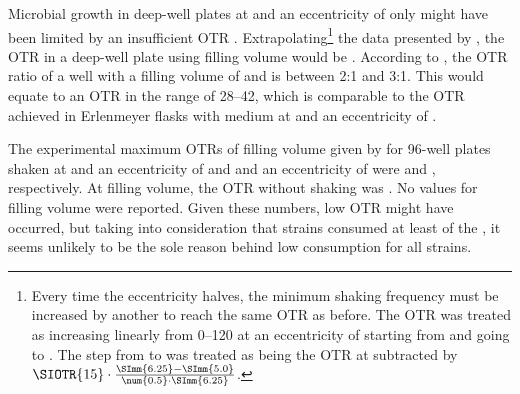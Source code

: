 % 
% 
Microbial growth in deep-well plates at  and an eccentricity of only  might have been limited by an insufficient OTR \cite{Duetz2000, Duetz2001, Duetz2004, Hermann2003}. Extrapolating\footnote{
Every time the eccentricity halves, the minimum shaking frequency must be increased by another  to reach the same OTR as before. The OTR was treated as increasing linearly from \SIrange{0}{120}{\otrunit} at an eccentricity of  starting from  and going to . The step from  to  was treated as being the OTR at  subtracted by 
$\SIOTR{15} \cdot { \frac{\SImm{6.25} - \SImm{5.0}}{\num{0.5} \cdot \SImm{6.25}} }$.
}
the data presented by \textcite{Duetz2004}, the OTR in a deep-well plate using  filling volume would be . According to \textcite{Duetz2000, Duetz2001}, the OTR ratio of a well with a filling volume of  and  is between 2:1 and 3:1. This would equate to an OTR in the range of \SIrange{28}{42}{\otrunit}, which is comparable to the OTR achieved in  Erlenmeyer flasks with  medium at  and an eccentricity of  \cite{Hermann2003}.

The experimental maximum OTRs of  filling volume given by \textcite{Hermann2003} for 96-well plates shaken at  and an eccentricity of  and  and an eccentricity of  were  and , respectively. At  filling volume, the OTR without shaking was  \cite{Hermann2003}. No values for  filling volume were reported. Given these numbers, low OTR might have occurred, but taking into consideration that  strains consumed at least  of the \xyl{}, it seems unlikely to be the sole reason behind low \xyl{} consumption for all strains.

